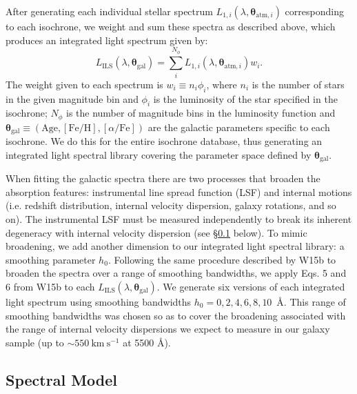 \documentclass[twocolumn]{aastex6}
\def\kms{\mathrm{km\ s^{-1}}}
\begin{document}
After generating each individual stellar spectrum $L_{1,i}\left(\lambda,\bm{\theta}_{\mathrm{atm},i}\right)$ corresponding to each isochrone, we weight and sum these spectra as described above, which produces an integrated light spectrum given by:
\begin{equation}
\label{L_ils}
L_\mathrm{ILS}\left(\lambda,\bm{\theta}_\mathrm{gal}\right)=\sum^{N_\phi}_i L_{1,i}\left(\lambda,\bm{\theta}_{\mathrm{atm},i}\right)w_i.
\end{equation}
The weight given to each spectrum is $w_i\equiv n_i\phi_i$, where  $n_i$ is the number of stars in the given magnitude bin and $\phi_i$ is the luminosity of the star specified in the isochrone; $N_\phi$ is the number of magnitude bins in the luminosity function and $\bm{\theta}_\mathrm{gal}\equiv\left(\mathrm{Age},\mathrm{[Fe/H]},[\alpha/\mathrm{Fe}]\right)$ are the galactic parameters specific to each isochrone.
We do this for the entire isochrone database, thus generating an integrated light spectral library covering the parameter space defined by $\bm{\theta_\mathrm{gal}}$.

When fitting the galactic spectra there are two processes that broaden the absorption features: instrumental line spread function (LSF) and internal motions (i.e. redshift distribution, internal velocity dispersion, galaxy rotations, and so on).
The instrumental LSF must be measured independently to break its inherent degeneracy with internal velocity dispersion (see \S\ref{Spectral Model} below).
To mimic broadening, we add another dimension to our integrated light spectral library: a smoothing parameter $h_0$.
Following the same procedure described by W15b to broaden the spectra over a range of smoothing bandwidths, we apply Eqs. 5 and 6 from W15b to each $L_\mathrm{ILS}\left(\lambda,\bm{\theta}_\mathrm{gal}\right)$.
We generate six versions of each integrated light spectrum using smoothing bandwidths $h_0=0,2,4,6,8,10$\ \AA.
This range of smoothing bandwidths was chosen so as to cover the broadening associated with the range of internal velocity dispersions we expect to measure in our galaxy sample (up to $\sim550\ \kms$ at 5500 \AA).

\subsection{Spectral Model}
\label{Spectral Model}
\end{document}
